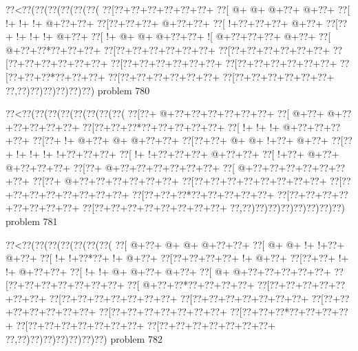 \vbox{\vbox{\goo
\0??<\0??(\0??(\0??(\0??(\0??(\0??(
\0??[\0??+\0??+\0??+\0??+\0??+\0??+
\0??[\- @+\- @+\- @+\0??+\- @+\0??+
\0??[\- !+\- !+\- !+\- @+\0??+\0??+
\0??[\0??+\0??+\0??+\- @+\0??+\0??+
\0??[\- !+\0??+\0??+\0??+\- @+\0??+
\0??[\0??+\- !+\- !+\- !+\- @+\0??+
\0??[\- !+\- @+\- @+\- @+\0??+\0??+
\- ![\- @+\0??+\0??+\0??+\- @+\0??+
\0??[\- @+\0??+\0??*\0??+\0??+\0??+
\0??[\0??+\0??+\0??+\0??+\0??+\0??+
\0??[\0??+\0??+\0??+\0??+\0??+\0??+
\0??[\0??+\0??+\0??+\0??+\0??+\0??+
\0??[\0??+\0??+\0??+\0??+\0??+\0??+
\0??[\0??+\0??+\0??+\0??+\0??+\0??+
\0??[\0??+\0??+\0??*\0??+\0??+\0??+
\0??[\0??+\0??+\0??+\0??+\0??+\0??+
\0??[\0??+\0??+\0??+\0??+\0??+\0??+
\0??,\0??)\0??)\0??)\0??)\0??)\0??)
}
\hfil problem 780\hfil\break
}

\vbox{\vbox{\goo
\0??<\0??(\0??(\0??(\0??(\0??(\0??(\0??(\0??(
\0??[\0??+\- @+\0??+\0??+\0??+\0??+\0??+\0??+
\0??[\- @+\0??+\- @+\0??+\0??+\0??+\0??+\0??+
\0??[\0??+\0??+\0??*\0??+\0??+\0??+\0??+\0??+
\0??[\- !+\- !+\- !+\- @+\0??+\0??+\0??+\0??+
\0??[\0??+\- !+\- @+\0??+\- @+\- @+\0??+\0??+
\0??[\0??+\0??+\- @+\- @+\- !+\0??+\- @+\0??+
\0??[\0??+\- !+\- !+\- !+\- !+\0??+\0??+\0??+
\0??[\- !+\- !+\0??+\0??+\0??+\- @+\0??+\0??+
\0??[\- !+\0??+\- @+\0??+\- @+\0??+\0??+\0??+
\0??[\0??+\- @+\0??+\0??+\0??+\0??+\0??+\0??+
\0??[\- @+\0??+\0??+\0??+\0??+\0??+\0??+\0??+
\0??[\0??+\- @+\0??+\0??+\0??+\0??+\0??+\0??+
\0??[\0??+\0??+\0??+\0??+\0??+\0??+\0??+\0??+
\0??[\0??+\0??+\0??+\0??+\0??+\0??+\0??+\0??+
\0??[\0??+\0??+\0??*\0??+\0??+\0??+\0??+\0??+
\0??[\0??+\0??+\0??+\0??+\0??+\0??+\0??+\0??+
\0??[\0??+\0??+\0??+\0??+\0??+\0??+\0??+\0??+
\0??,\0??)\0??)\0??)\0??)\0??)\0??)\0??)\0??)
}
\hfil problem 781\hfil\break
}

\vbox{\vbox{\goo
\0??<\0??(\0??(\0??(\0??(\0??(\0??(\0??(
\0??[\- @+\0??+\- @+\- @+\- @+\0??+\0??+
\0??[\- @+\- @+\- !+\- !+\0??+\- @+\0??+
\0??[\- !+\- !+\0??*\0??+\- !+\- @+\0??+
\0??[\0??+\0??+\0??+\0??+\- !+\- @+\0??+
\0??[\0??+\0??+\- !+\- !+\- @+\0??+\0??+
\0??[\- !+\- !+\- @+\- @+\0??+\- @+\0??+
\0??[\- @+\- @+\0??+\0??+\0??+\0??+\0??+
\0??[\0??+\0??+\0??+\0??+\0??+\0??+\0??+
\0??[\- @+\0??+\0??*\0??+\0??+\0??+\0??+
\0??[\0??+\0??+\0??+\0??+\0??+\0??+\0??+
\0??[\0??+\0??+\0??+\0??+\0??+\0??+\0??+
\0??[\0??+\0??+\0??+\0??+\0??+\0??+\0??+
\0??[\0??+\0??+\0??+\0??+\0??+\0??+\0??+
\0??[\0??+\0??+\0??+\0??+\0??+\0??+\0??+
\0??[\0??+\0??+\0??*\0??+\0??+\0??+\0??+
\0??[\0??+\0??+\0??+\0??+\0??+\0??+\0??+
\0??[\0??+\0??+\0??+\0??+\0??+\0??+\0??+
\0??,\0??)\0??)\0??)\0??)\0??)\0??)\0??)
}
\hfil problem 782\hfil\break
}

